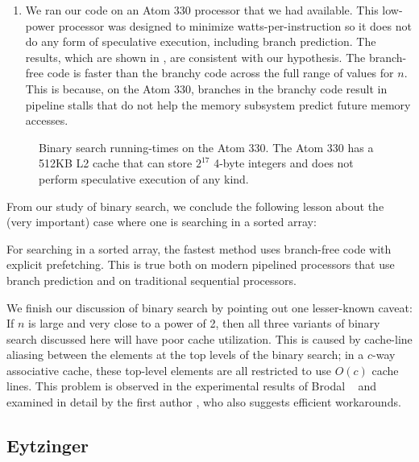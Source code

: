 \documentclass{patmorin}
\begin{document}
\begin{enumerate}
\item We ran our code on an Atom 330 processor that we had available. This
   low-power processor was designed to minimize watts-per-instruction
   so it does not do any form of speculative execution, including
   branch prediction. The results, which are shown in ,
   are consistent with our hypothesis.  The branch-free code is faster
   than the branchy code across the full range of values for $n$.
   This is because, on the Atom 330, branches in the branchy code result
   in pipeline stalls that do not help the memory subsystem predict
   future memory accesses.
\end{enumerate}

\begin{figure}
   \caption{Binary search running-times on the Atom 330. The Atom 330
   has a 512KB L2 cache that can store $2^{17}$ 4-byte integers and does
   not perform speculative execution of any kind.}
\end{figure}

From our study of binary search, we conclude the following lesson about
the (very important) case where one is searching in a sorted array:

\begin{lesson}
  For searching in a sorted array, the fastest method uses branch-free
  code with explicit prefetching.  This is true both on modern pipelined
  processors that use branch prediction and on traditional sequential
  processors.
\end{lesson}

We finish our discussion of binary search by pointing out one lesser-known
caveat:  If $n$ is large and very close to a power of 2, then all
three variants of binary search discussed here will have poor cache
utilization.  This is caused by cache-line aliasing between the elements
at the top levels of the binary search; in a $c$-way associative cache,
these top-level elements are all restricted to use $O(c)$ cache lines.
This problem is observed in the experimental results of Brodal \etal\
\cite[Section~4.2]{brodal.fagerberg.ea:cache} and examined in detail
by the first author \cite{khuong:binary}, who also suggests efficient
workarounds.

\subsection{Eytzinger}
\end{document}
